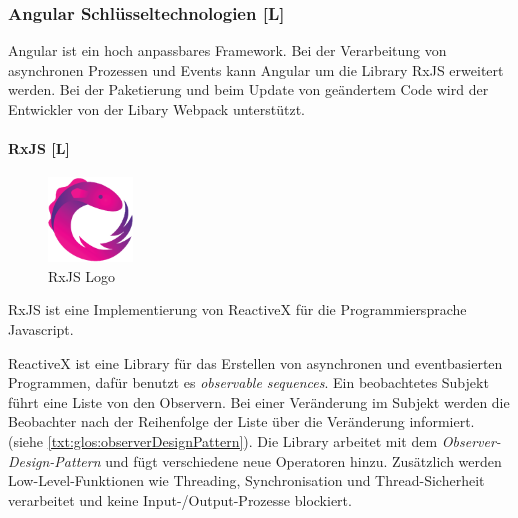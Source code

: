 \subsubsection{Angular Schlüsseltechnologien [L]}
Angular ist ein hoch anpassbares Framework. Bei der Verarbeitung von asynchronen Prozessen und Events kann Angular um die Library RxJS erweitert werden. Bei der Paketierung und beim Update von geändertem Code wird der Entwickler von der Libary Webpack unterstützt. 

\paragraph{RxJS [L]}
\begin{figure}
  \begin{center}
    \includegraphics[width=0.2\textwidth]{pics/RxJs_logo.png}
   \caption{RxJS Logo}
  \end{center}
\end{figure}
RxJS ist eine Implementierung von ReactiveX für die Programmiersprache Javascript.

ReactiveX ist eine Library für das Erstellen von asynchronen und eventbasierten Programmen, dafür benutzt es \emph{observable sequences}. Ein beobachtetes Subjekt führt eine Liste von den Observern. Bei einer Veränderung im Subjekt werden die Beobachter nach der Reihenfolge der Liste über die Veränderung informiert. (siehe \ref{txt:glos:observerDesignPattern}).
Die Library arbeitet mit dem \emph{Observer-Design-Pattern} und fügt verschiedene neue Operatoren hinzu. Zusätzlich werden Low-Level-Funktionen wie Threading, Synchronisation und Thread-Sicherheit verarbeitet und keine Input-/Output-Prozesse blockiert. \cite{ReactiveXIntro}

